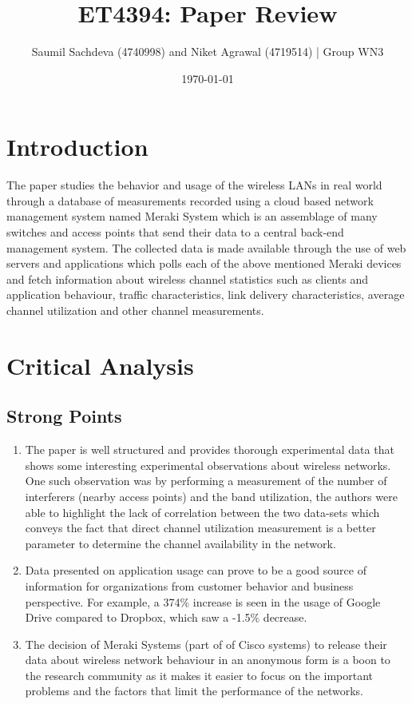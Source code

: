 \documentclass{article}
\begin{document}
\title{ET4394: Paper Review}

\author{Saumil Sachdeva (4740998) and Niket Agrawal (4719514) | Group WN3
}
\date{\today}

\maketitle

\section{Introduction}
The paper \cite{topic} studies the behavior and usage of the wireless LANs in real world through a database of measurements recorded using a cloud based network management system named Meraki System which is an assemblage of many switches and access points that send their data to a central back-end management system. The collected data is made available through the use of web servers and applications which polls each of the above mentioned Meraki devices and fetch information about wireless channel statistics such as clients and application behaviour, traffic characteristics, link delivery characteristics, average channel utilization and other channel measurements. 



\section{Critical Analysis}
\subsection{Strong Points}
\begin{enumerate}
    \item The paper is well structured and provides thorough experimental data that shows some interesting experimental observations about wireless networks. One such observation was by performing a measurement of the number of interferers (nearby access points) and the band utilization, the authors were able to highlight the lack of correlation between the two data-sets which conveys the fact that direct channel utilization measurement is a better parameter to determine the channel availability in the network. 
    \item Data presented on application usage can prove to be a good source of information for organizations from customer behavior and business perspective. For example, a 374\% increase is seen in the usage of Google Drive compared to Dropbox, which saw a -1.5\% decrease.
    \item The decision of Meraki Systems (part of of Cisco systems) to release their data about wireless network behaviour in an anonymous form is a boon to the research community as it makes it easier to focus on the important problems and the factors that limit the performance of the networks.
    \end{enumerate}
\end{document}
